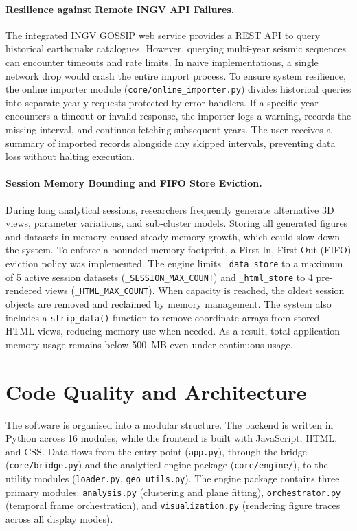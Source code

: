\paragraph{Resilience against Remote INGV API Failures.}
The integrated INGV GOSSIP web service provides a REST API to query historical earthquake catalogues. However, querying multi-year seismic sequences can encounter timeouts and rate limits. In naive implementations, a single network drop would crash the entire import process. To ensure system resilience, the online importer module (\texttt{core/online\_importer.py}) divides historical queries into separate yearly requests protected by error handlers. If a specific year encounters a timeout or invalid response, the importer logs a warning, records the missing interval, and continues fetching subsequent years. The user receives a summary of imported records alongside any skipped intervals, preventing data loss without halting execution.

\paragraph{Session Memory Bounding and FIFO Store Eviction.}
During long analytical sessions, researchers frequently generate alternative 3D views, parameter variations, and sub-cluster models. Storing all generated figures and datasets in memory caused steady memory growth, which could slow down the system. To enforce a bounded memory footprint, a First-In, First-Out (FIFO) eviction policy was implemented. The engine limits \texttt{\_data\_store} to a maximum of 5 active session datasets (\texttt{\_SESSION\_MAX\_COUNT}) and \texttt{\_html\_store} to 4 pre-rendered views (\texttt{\_HTML\_MAX\_COUNT}). When capacity is reached, the oldest session objects are removed and reclaimed by memory management. The system also includes a \texttt{strip\_data()} function to remove coordinate arrays from stored HTML views, reducing memory use when needed. As a result, total application memory usage remains below 500~MB even under continuous usage.

\section{Code Quality and Architecture}
\label{sec:code-quality}

The software is organised into a modular structure. The backend is written in Python across 16 modules, while the frontend is built with JavaScript, HTML, and CSS. Data flows from the entry point (\texttt{app.py}), through the bridge (\texttt{core/\allowbreak bridge.py}) and the analytical engine package (\texttt{core/\allowbreak engine/}), to the utility modules (\texttt{loader.py}, \texttt{geo\_utils.py}). The engine package contains three primary modules: \texttt{analysis.py} (clustering and plane fitting), \texttt{orchestrator.py} (temporal frame orchestration), and \texttt{visualization.py} (rendering figure traces across all display modes).

